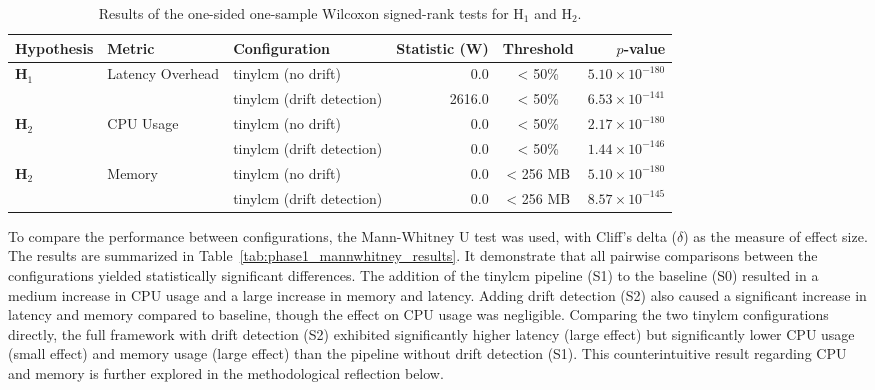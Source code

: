 \begin{table}[htbp]
    \centering
    \caption[Summary of Hypothesis Test Results for H$_1$ and H$_2$]{Results of the one-sided one-sample Wilcoxon signed-rank tests for H$_1$ and H$_2$.}
    \label{tab:h1_h2_test_results}
    \footnotesize
    \begin{tabularx}{\linewidth}{@{}l l X r c r@{}}
        \toprule
        \textbf{Hypothesis} & \textbf{Metric} & \textbf{Configuration} & \textbf{Statistic (W)} & \textbf{Threshold} & \textbf{$p$-value} \\
        \midrule
        \textbf{H$_1$} & Latency Overhead & \gls{tinylcm} (no drift) & 0.0 & < 50\% & $5.10\times10^{-180}$ \\
                      &                   & \gls{tinylcm} (drift detection) & 2616.0 & < 50\% & $6.53\times10^{-141}$ \\
        \addlinespace
        \textbf{H$_2$} & CPU Usage & \gls{tinylcm} (no drift) & 0.0 & < 50\% & $2.17\times10^{-180}$ \\
                      &           & \gls{tinylcm} (drift detection) & 0.0 & < 50\% & $1.44\times10^{-146}$ \\
        \addlinespace
        \textbf{H$_2$} & Memory & \gls{tinylcm} (no drift) & 0.0 & < 256 MB & $5.10\times10^{-180}$ \\
                      &        & \gls{tinylcm} (drift detection) & 0.0 & < 256 MB & $8.57\times10^{-145}$ \\
        \bottomrule
    \end{tabularx}
\end{table}

To compare the performance between configurations, the Mann-Whitney U test was used, with Cliff's delta ($\delta$) as the measure of effect size. The results are summarized in Table~\ref{tab:phase1_mannwhitney_results}. It demonstrate that all pairwise comparisons between the configurations yielded statistically significant differences. The addition of the \gls{tinylcm} pipeline (S1) to the baseline (S0) resulted in a medium increase in CPU usage and a large increase in memory and latency. Adding drift detection (S2) also caused a significant increase in latency and memory compared to baseline, though the effect on CPU usage was negligible.
Comparing the two \gls{tinylcm} configurations directly, the full framework with drift detection (S2) exhibited significantly higher latency (large effect) but significantly lower CPU usage (small effect) and memory usage (large effect) than the pipeline without drift detection (S1). This counterintuitive result regarding CPU and memory is further explored in the methodological reflection below.

